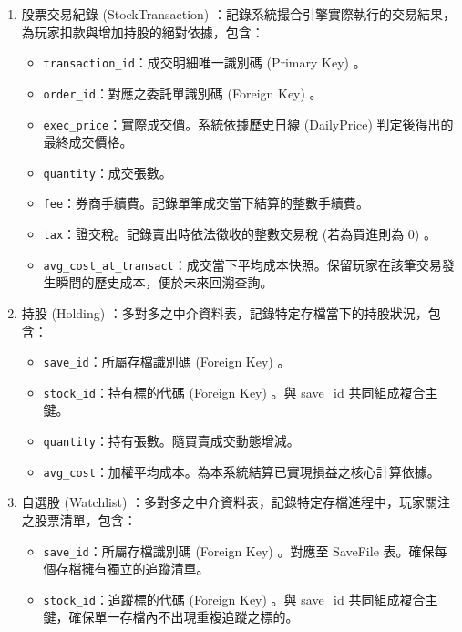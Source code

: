 \documentclass[UTF8, a4paper, 12pt, fontset=none]{ctexart}
\begin{document}
\begin{enumerate}
        \item 股票交易紀錄 (StockTransaction) ：記錄系統撮合引擎實際執行的交易結果，為玩家扣款與增加持股的絕對依據，包含：
        \begin{itemize}
            \item \texttt{transaction\_id}：成交明細唯一識別碼 (Primary Key) 。
            \item \texttt{order\_id}：對應之委託單識別碼 (Foreign Key) 。
            \item \texttt{exec\_price}：實際成交價。系統依據歷史日線 (DailyPrice) 判定後得出的最終成交價格。
            \item \texttt{quantity}：成交張數。
            \item \texttt{fee}：券商手續費。記錄單筆成交當下結算的整數手續費。
            \item \texttt{tax}：證交稅。記錄賣出時依法徵收的整數交易稅 (若為買進則為 0) 。
            \item \texttt{avg\_cost\_at\_transact}：成交當下平均成本快照。保留玩家在該筆交易發生瞬間的歷史成本，便於未來回溯查詢。
        \end{itemize}

        \item 持股 (Holding) ：多對多之中介資料表，記錄特定存檔當下的持股狀況，包含：
        \begin{itemize}
            \item \texttt{save\_id}：所屬存檔識別碼 (Foreign Key) 。
            \item \texttt{stock\_id}：持有標的代碼 (Foreign Key) 。與 save\_id 共同組成複合主鍵。
            \item \texttt{quantity}：持有張數。隨買賣成交動態增減。
            \item \texttt{avg\_cost}：加權平均成本。為本系統結算已實現損益之核心計算依據。
        \end{itemize}
        \item 自選股 (Watchlist) ：多對多之中介資料表，記錄特定存檔進程中，玩家關注之股票清單，包含：
        \begin{itemize}
            \item \texttt{save\_id}：所屬存檔識別碼 (Foreign Key) 。對應至 SaveFile 表。確保每個存檔擁有獨立的追蹤清單。
            \item \texttt{stock\_id}：追蹤標的代碼 (Foreign Key) 。與 save\_id 共同組成複合主鍵，確保單一存檔內不出現重複追蹤之標的。
        \end{itemize}
    \end{enumerate}
\end{document}
